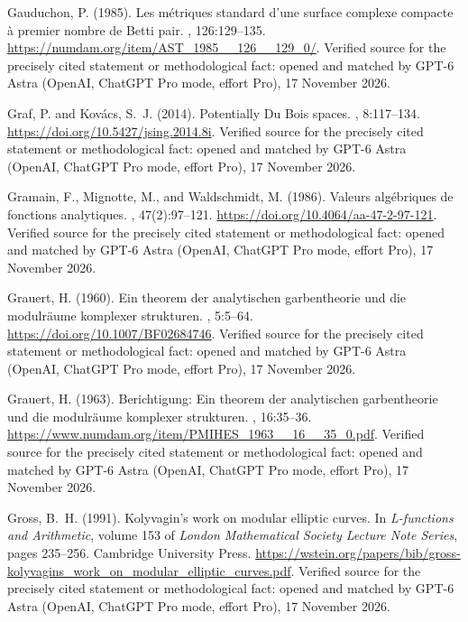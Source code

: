\begin{thebibliography}{}
Gauduchon, P. (1985).
\newblock Les m\'etriques standard d'une surface complexe compacte \`a premier
  nombre de {Betti} pair.
, 126:129--135.
\newblock \url{https://numdam.org/item/AST_1985__126__129_0/}. Verified source for the precisely cited statement or methodological fact: opened and matched by GPT-6 Astra (OpenAI, ChatGPT Pro mode, effort Pro), 17 November 2026.

Graf, P. and Kov{\'a}cs, S.~J. (2014).
\newblock Potentially {Du Bois} spaces.
, 8:117--134.
\newblock \url{https://doi.org/10.5427/jsing.2014.8i}. Verified source for the precisely cited statement or methodological fact: opened and matched by GPT-6 Astra (OpenAI, ChatGPT Pro mode, effort Pro), 17 November 2026.

Gramain, F., Mignotte, M., and Waldschmidt, M. (1986).
\newblock Valeurs alg\'ebriques de fonctions analytiques.
, 47(2):97--121.
\newblock \url{https://doi.org/10.4064/aa-47-2-97-121}. Verified source for the precisely cited statement or methodological fact: opened and matched by GPT-6 Astra (OpenAI, ChatGPT Pro mode, effort Pro), 17 November 2026.

Grauert, H. (1960).
\newblock Ein theorem der analytischen garbentheorie und die modulräume
  komplexer strukturen.
, 5:5--64.
\newblock \url{https://doi.org/10.1007/BF02684746}. Verified source for the precisely cited statement or methodological fact: opened and matched by GPT-6 Astra (OpenAI, ChatGPT Pro mode, effort Pro), 17 November 2026.

Grauert, H. (1963).
\newblock Berichtigung: Ein theorem der analytischen garbentheorie und die
  modulräume komplexer strukturen.
, 16:35--36.
\newblock \url{https://www.numdam.org/item/PMIHES_1963__16__35_0.pdf}. Verified source for the precisely cited statement or methodological fact: opened and matched by GPT-6 Astra (OpenAI, ChatGPT Pro mode, effort Pro), 17 November 2026.

Gross, B.~H. (1991).
\newblock Kolyvagin's work on modular elliptic curves.
\newblock In {\em L-functions and Arithmetic}, volume 153 of {\em London
  Mathematical Society Lecture Note Series}, pages 235--256. Cambridge
  University Press.
\newblock \url{https://wstein.org/papers/bib/gross-kolyvagins_work_on_modular_elliptic_curves.pdf}. Verified source for the precisely cited statement or methodological fact: opened and matched by GPT-6 Astra (OpenAI, ChatGPT Pro mode, effort Pro), 17 November 2026.


\end{thebibliography}
